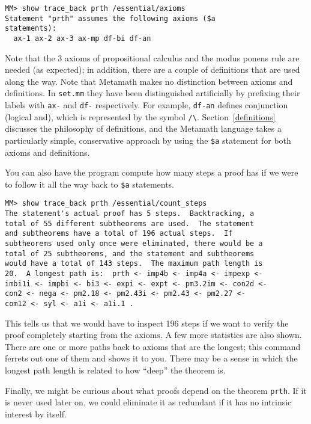 \begin{verbatim}
MM> show trace_back prth /essential/axioms
Statement "prth" assumes the following axioms ($a
statements):
  ax-1 ax-2 ax-3 ax-mp df-bi df-an
\end{verbatim}

Note that the 3 axioms of propositional calculus and the modus ponens rule are
needed (as expected); in addition, there are a couple of definitions that are used
along the way.  Note that Metamath makes no distinction between axioms and definitions.  In
\texttt{set.mm} they have been distinguished artificially by prefixing their
labels\index{labels in \texttt{set.mm}} with \texttt{ax-} and \texttt{df-}
respectively.  For example, \texttt{df-an} defines conjunction (logical {\sc
and}), which is represented by the symbol \verb+/\+.
Section~\ref{definitions} discusses the philosophy of definitions, and the
Metamath language takes a particularly simple, conservative approach by using
the \texttt{\$a}\index{\texttt{\$a} statement} statement for both axioms and
definitions.

You can also have the program compute how many steps a proof
has if we were to follow it all the way back to
\texttt{\$a} statements.

\begin{verbatim}
MM> show trace_back prth /essential/count_steps
The statement's actual proof has 5 steps.  Backtracking, a
total of 55 different subtheorems are used.  The statement
and subtheorems have a total of 196 actual steps.  If
subtheorems used only once were eliminated, there would be a
total of 25 subtheorems, and the statement and subtheorems
would have a total of 143 steps.  The maximum path length is
20.  A longest path is:  prth <- imp4b <- imp4a <- impexp <-
imbi1i <- impbi <- bi3 <- expi <- expt <- pm3.2im <- con2d <-
con2 <- nega <- pm2.18 <- pm2.43i <- pm2.43 <- pm2.27 <-
com12 <- syl <- a1i <- a1i.1 .
\end{verbatim}

This tells us that we would have to inspect 196 steps if we want to
verify the proof completely starting from the axioms.  A few more
statistics are also shown.  There are one or more paths back to axioms
that are the longest; this command ferrets out one of them and shows it
to you.  There may be a sense in which the longest path length is
related to how ``deep'' the theorem is.

Finally, we might be curious about what proofs depend on the theorem
\texttt{prth}.  If it is never used later on, we could eliminate it as
redundant if it has no intrinsic interest by itself.\index{\texttt{show
usage} command}

